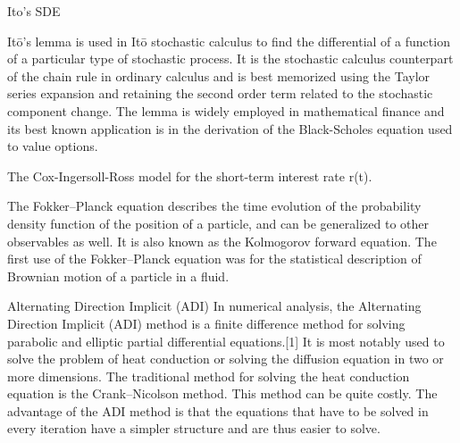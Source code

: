 Ito’s  SDE
 
 
Itō's lemma is used in Itō stochastic calculus to find the differential of a function of a particular type of stochastic process. It is the stochastic calculus counterpart of the chain rule in ordinary calculus and is best memorized using the Taylor series expansion and retaining the second order term related to the stochastic component change. The lemma is widely employed in mathematical finance and its best known application is in the derivation of the Black-Scholes equation used to value options.
 
 
The Cox-Ingersoll-Ross model for the short-term interest rate r(t).
 
The Fokker–Planck equation describes the time evolution of the probability density function of the position of a particle, and can be generalized to other observables as well. It is also known as the Kolmogorov forward equation. The first use of the Fokker–Planck equation was for the statistical description of Brownian motion of a particle in a fluid.
 
Alternating Direction Implicit (ADI)
In numerical analysis, the Alternating Direction Implicit (ADI) method is a finite difference method for solving parabolic and elliptic partial differential equations.[1] It is most notably used to solve the problem of heat conduction or solving the diffusion equation in two or more dimensions.
The traditional method for solving the heat conduction equation is the Crank–Nicolson method. This method can be quite costly. The advantage of the ADI method is that the equations that have to be solved in every iteration have a simpler structure and are thus easier to solve.
 
